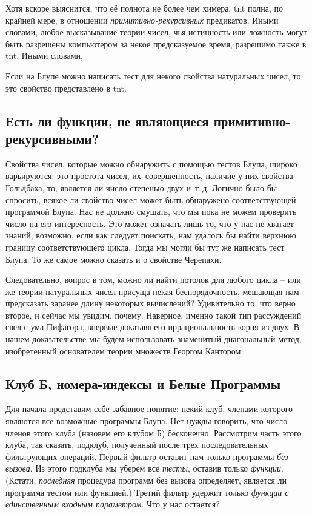 \documentclass[../main.tex]{subfiles}
\begin{document}
Хотя вскоре выяснится, что её полнота не более чем химера, \acs{tnt} полна, по крайней мере, в отношении \emph{примитивно-рекурсивных} предикатов. Иными словами, любое высказывание теории чисел, чья истинность или ложность могут быть разрешены компьютером за некое предсказуемое время, разрешимо также в \acs{tnt}\@. Иными словами,

Если на Блупе можно написать тест для некого свойства натуральных чисел, то это свойство представлено в \acs{tnt}.


\subsection{Есть ли функции, не являющиеся примитивно-рекурсивными?}

Свойства чисел, которые можно обнаружить с помощью тестов Блупа, широко варьируются: это простота чисел, их~совершенность, наличие у них свойства Гольдбаха, то, является ли число степенью двух и~т.\,д. Логично было бы спросить, всякое ли свойство чисел может быть обнаружено соответствующей программой Блупа. Нас не должно смущать, что мы пока не можем проверить число на его интересность. Это может означать лишь то, что у нас не хватает знаний; возможно, если как следует поискать, нам удалось бы найти верхнюю границу соответствующего цикла. Тогда мы могли бы тут же написать тест Блупа. То же самое можно сказать и о свойстве Черепахи.

Следовательно, вопрос в том, можно ли найти потолок для любого цикла \--- или же теории натуральных чисел присуща некая беспорядочность, мешающая нам предсказать заранее длину некоторых вычислений? Удивительно то, что верно второе, и сейчас мы увидим, почему. Наверное, именно такой тип рассуждений свел с ума Пифагора, впервые доказавшего иррациональность корня из двух. В нашем доказательстве мы будем использовать знаменитый диагональный метод, изобретенный основателем теории множеств Георгом Кантором.


\subsection{Клуб Б, номера-индексы и Белые Программы}

Для начала представим себе забавное понятие: некий клуб, членами которого являются все возможные программы Блупа. Нет нужды говорить, что число членов этого клуба (назовем его клубом Б) бесконечно. Рассмотрим часть этого клуба, так сказать, подклуб, полученный после трех последовательных фильтрующих операций. Первый фильтр оставит нам только программы \emph{без вызова}. Из этого подклуба мы уберем все \emph{тесты}, оставив только \emph{функции}. (Кстати, \emph{последняя} процедура программ без вызова определяет, является ли программа тестом или функцией.) Третий фильтр удержит только \emph{функции с единственным входным параметром}. Что у нас остается?
\end{document}
